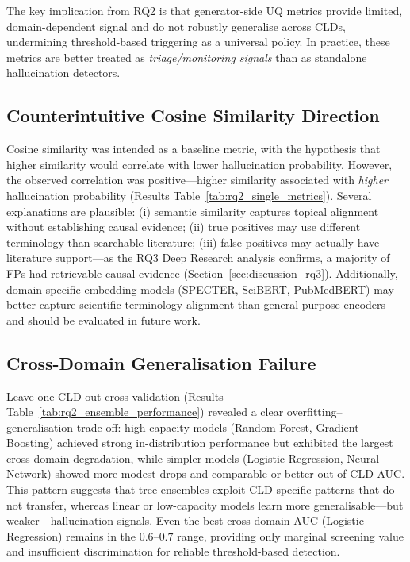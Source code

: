 The key implication from RQ2 is that generator-side UQ metrics provide limited, domain-dependent signal and do not robustly generalise across CLDs, undermining threshold-based triggering as a universal policy. In practice, these metrics are better treated as \textit{triage/monitoring signals} than as standalone hallucination detectors.

\subsection{Counterintuitive Cosine Similarity Direction}
\label{sec:cosine_paradox}

Cosine similarity was intended as a baseline metric, with the hypothesis that higher similarity would correlate with lower hallucination probability. However, the observed correlation was positive---higher similarity associated with \textit{higher} hallucination probability (Results Table~\ref{tab:rq2_single_metrics}). Several explanations are plausible: (i) semantic similarity captures topical alignment without establishing causal evidence; (ii) true positives may use different terminology than searchable literature; (iii) false positives may actually have literature support---as the RQ3 Deep Research analysis confirms, a majority of FPs had retrievable causal evidence (Section~\ref{sec:discussion_rq3}). Additionally, domain-specific embedding models (SPECTER, SciBERT, PubMedBERT) may better capture scientific terminology alignment than general-purpose encoders and should be evaluated in future work.

\subsection{Cross-Domain Generalisation Failure}

Leave-one-CLD-out cross-validation (Results Table~\ref{tab:rq2_ensemble_performance}) revealed a clear overfitting--generalisation trade-off: high-capacity models (Random Forest, Gradient Boosting) achieved strong in-distribution performance but exhibited the largest cross-domain degradation, while simpler models (Logistic Regression, Neural Network) showed more modest drops and comparable or better out-of-CLD AUC. This pattern suggests that tree ensembles exploit CLD-specific patterns that do not transfer, whereas linear or low-capacity models learn more generalisable---but weaker---hallucination signals. Even the best cross-domain AUC (Logistic Regression) remains in the $0.6$--$0.7$ range, providing only marginal screening value and insufficient discrimination for reliable threshold-based detection.

